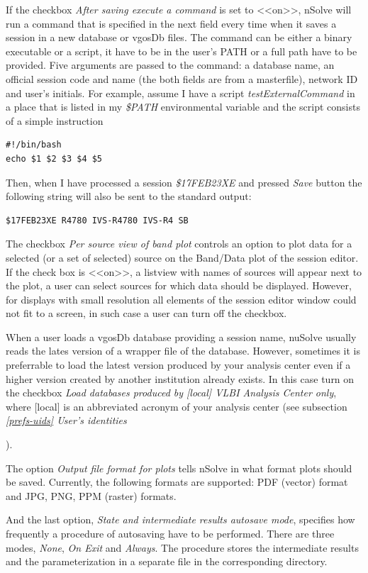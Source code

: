 \documentclass [10pt,letterpaper]{report}
\newcommand{\nuSolve}{\greektext n\latintext Solve}
\begin{document}
{If the checkbox {\sl After saving execute a command} is set to <<on>>,
\nuSolve{} will run a command that is specified in the next field every
time when it saves a session in a new database or vgosDb files.
The command can be either a binary executable or a script, it have to
be in the user's PATH or a full path have to be provided. Five arguments
are passed to the command: a database name, an official session code
and name (the both fields are from a masterfile), network ID and user's
initials. For example, assume I have a script {\sl testExternalCommand}
in a place that is listed in my {\sl \$PATH} environmental variable and
the script consists of a simple instruction
\begin{verbatim}
#!/bin/bash
echo $1 $2 $3 $4 $5
\end{verbatim}
\noindent
Then, when I have processed a session {\sl \$17FEB23XE} and pressed
{\sl Save} button the following string will also be sent to the standard
output:
\begin{verbatim}
$17FEB23XE R4780 IVS-R4780 IVS-R4 SB
\end{verbatim}

The checkbox {\sl Per source view of band plot} controls an option
to plot data for a selected (or a set of selected) source on the Band/Data
plot of the session editor. If the check box is <<on>>, a listview with
names of sources will appear next to the plot, a user can select sources
for which data should be displayed. However, for displays with small
resolution all elements of the session editor window could not fit to
a screen, in such case a user can turn off the checkbox.

When a user loads a vgosDb database providing a session name, nuSolve
usually reads the lates version of a wrapper file of the database.
However, sometimes it is preferrable to load the latest version produced
by your analysis center even if a higher version created by another
institution already exists. In this case turn on the checkbox
{\sl Load databases produced by [local] VLBI Analysis Center only}, where
[local] is an abbreviated acronym of your analysis center (see subsection
\emph{\ref{prefs-uids} User's identities}}).


The option {\sl Output file format for plots} tells \nuSolve{} in
what format plots should be saved. Currently, the following formats
are supported: PDF (vector) format and JPG, PNG, PPM (raster) formats.


And the last option, {\sl State and intermediate results autosave
mode}, specifies how frequently a procedure of autosaving have to be
performed. There are three modes, {\sl None}, {\sl On Exit} and {\sl
Always}. The procedure stores the intermediate results and the
parameterization in a separate file in the corresponding directory.
\end{document}
